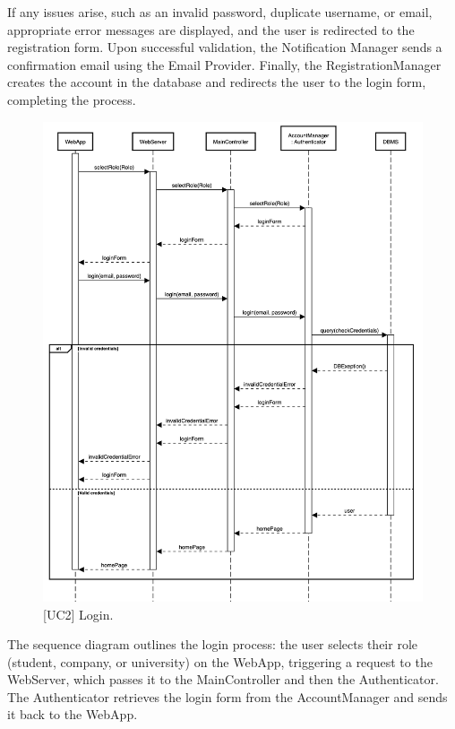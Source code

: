 If any issues arise, such as an invalid password, duplicate username, or email, appropriate error messages are displayed, and the user is redirected to the registration form. Upon successful validation, the Notification Manager sends a confirmation email using the Email Provider. Finally, the RegistrationManager creates the account in the database and redirects the user to the login form, completing the process.

\begin{figure}[htbp]
    \centering
    \includegraphics[width=\linewidth]{DD/Images/sequenceDiagrams/login.png}
    \caption{[UC2] Login.}
    \label{fig:login_immagine}
\end{figure}
\clearpage

The sequence diagram outlines the login process: the user selects their role (student, company, or university) on the WebApp, triggering a request to the WebServer, which passes it to the MainController and then the Authenticator. The Authenticator retrieves the login form from the AccountManager and sends it back to the WebApp.

